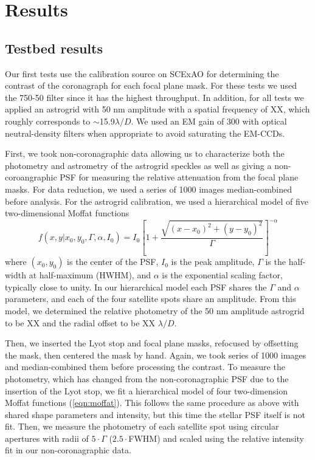 \documentclass[]{spie}  %
\begin{document}
\section{Results}\label{sec:results}

\subsection{Testbed results}\label{sec:testbed}

Our first tests use the calibration source on SCExAO for determining the contrast of the coronagraph for each focal plane mask. For these tests we used the 750-50 filter since it has the highest throughput. In addition, for all tests we applied an astrogrid with 50 nm amplitude with a spatial frequency of XX, which roughly corresponds to $\sim$15.9$\lambda/D$. We used an EM gain of 300 with optical neutral-density filters when appropriate to avoid saturating the EM-CCDs.

First, we took non-coronagraphic data allowing us to characterize both the photometry and astrometry of the astrogrid speckles as well as giving a non-coroangraphic PSF for measuring the relative attenuation from the focal plane masks. For data reduction, we used a series of 1000 images median-combined before analysis. For the astrogrid calibration, we used a hierarchical model of five two-dimensional Moffat functions
\begin{equation}
   \label{eqn:moffat}
   f(x, y | x_0, y_0, \Gamma, \alpha, I_0) = I_0 \left[1 + \frac{\sqrt{\left(x-x_0\right)^2 + \left(y-y_0\right)^2}}{\Gamma} \right]^{-\alpha}
\end{equation}
where $(x_0, y_0)$ is the center of the PSF, $I_0$ is the peak amplitude, $\Gamma$ is the half-width at half-maximum (HWHM), and $\alpha$ is the exponential scaling factor, typically close to unity. In our hierarchical model each PSF shares the $\Gamma$ and $\alpha$ parameters, and each of the four satellite spots share an amplitude. From this model, we determined the relative photometry of the 50 nm amplitude astrogrid to be XX and the radial offset to be XX $\lambda/D$.

Then, we inserted the Lyot stop and focal plane masks, refocused by offsetting the mask, then centered the mask by hand. Again, we took series of 1000 images and median-combined them before processing the contrast. To measure the photometry, which has changed from the non-coronagraphic PSF due to the insertion of the Lyot stop, we fit a hierarchical model of four two-dimension Moffat functions (\autoref{eqn:moffat}). This follows the same procedure as above with shared shape parameters and intensity, but this time the stellar PSF itself is not fit. Then, we measure the photometry of each satellite spot using circular apertures with radii of $5\cdot\Gamma$ ($2.5\cdot$FWHM) and scaled using the relative intensity fit in our non-coronagraphic data.
\end{document}
